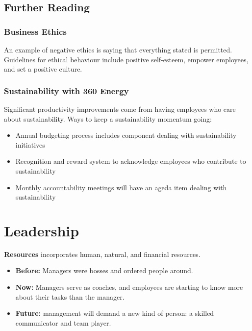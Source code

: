 \documentclass[english, 12pt]{article}
\begin{document}
\subsection*{Further Reading}
\subsubsection*{Business Ethics}
An example of negative ethics is saying that everything stated is permitted. Guidelines for ethical behaviour include positive self-esteem, empower employees, and set a positive culture.

\subsubsection*{Sustainability with 360 Energy}
Significant productivity improvements come from having employees who care about sustainability. Ways to keep a sustainability momentum going: 
\begin{itemize}
\item Annual budgeting process includes component dealing with sustainability initiatives
\item Recognition and reward system to acknowledge employees who contribute to sustainability
\item Monthly accountability meetings will have an ageda item dealing with sustainability
\end{itemize}
\section{Leadership}
\begin{defn}
\textbf{Resources} incorporates human, natural, and financial resources.
\end{defn}
\begin{itemize}
\item \textbf{Before:} Managers were bosses and ordered people around.
\item \textbf{Now:} Managers serve as coaches, and employees are starting to know more about their tasks than the manager.
\item \textbf{Future:} management will demand a new kind of person: a skilled communicator and team player.
\end{itemize}
\end{document}
